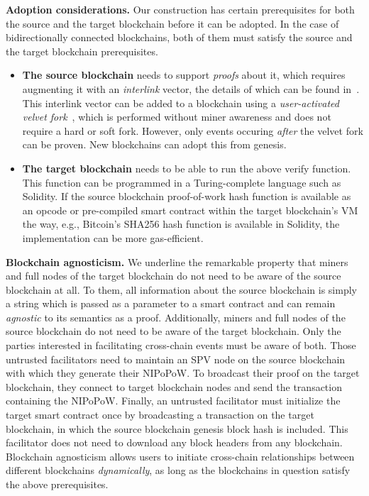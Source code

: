 \noindent
\textbf{Adoption considerations. } Our construction has certain prerequisites
for both the source and the target blockchain before it can be adopted. In the
case of bidirectionally connected blockchains, both of them must satisfy the
source and the target blockchain prerequisites.

\begin{itemize}
  \item \textbf{The source blockchain} needs to support \emph{proofs} about it,
        which requires augmenting it with an \emph{interlink} vector, the
        details of which can be found in~\cite{popow}. This interlink vector
        can be added to a blockchain using a \emph{user-activated velvet
        fork}~\cite{nipopows,velvet}, which is performed without miner awareness
        and does not require a hard or soft fork. However, only events occuring
        \emph{after} the velvet fork can be proven. New blockchains can adopt
        this from genesis.
  \item \textbf{The target blockchain} needs to be able to run the above
        \textsf{verify} function. This function can be programmed in a
        Turing-complete language such as Solidity. If the source blockchain
        proof-of-work hash function is available as an opcode or pre-compiled
        smart contract within the target blockchain's VM the way, e.g.,
        Bitcoin's SHA256 hash function is available in Solidity, the
        implementation can be more gas-efficient.
\end{itemize}

\noindent
\textbf{Blockchain agnosticism. }
We underline the remarkable property that miners and full nodes of the target
blockchain do not need to be aware of the source blockchain at all. To them,
all information about the source blockchain is simply a string which is passed
as a parameter to a smart contract and can remain \emph{agnostic} to its
semantics as a proof. Additionally, miners and full nodes of the source
blockchain do not need to be aware of the target blockchain. Only the parties
interested in facilitating cross-chain events must be aware of both. Those
untrusted facilitators need to maintain an SPV node on the source blockchain
with which they generate their NIPoPoW. To broadcast their proof on the target
blockchain, they connect to target blockchain nodes and send the transaction
containing the NIPoPoW. Finally, an untrusted facilitator must initialize the
target smart contract once by broadcasting a transaction on the target
blockchain, in which the source blockchain genesis block hash is included. This
facilitator does not need to download any block headers from any blockchain.
Blockchain agnosticism allows users to initiate cross-chain relationships
between different blockchains \emph{dynamically}, as long as the blockchains in
question satisfy the above prerequisites.


